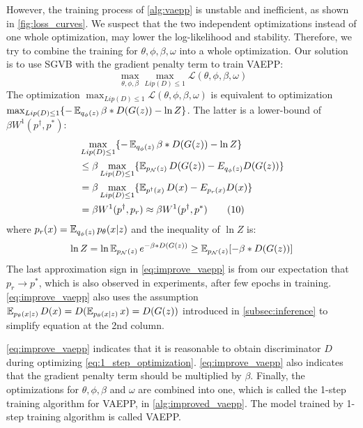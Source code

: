 However, the training process of \cref{alg:vaepp} is unstable and inefficient, as shown in \cref{fig:loss_curves}. 
We suspect that the two independent optimizations instead of one whole optimization, may lower the log-likelihood and stability. Therefore, we try to combine the training for $\theta, \phi, \beta, \omega$ into a whole optimization. 
Our solution is to use SGVB with the gradient penalty term to train VAEPP:
\begin{equation*}~\label{eq:1_step_optimization}
	\max_{\theta, \phi, \beta} \max_{Lip(D) \leq 1} \mathcal{L}(\theta, \phi, \beta, \omega) 
\end{equation*} 
The optimization $\max_{Lip(D) \leq 1} \mathcal{L}(\theta, \phi, \beta, \omega)$ is equivalent to optimization $\max_{Lip(D) \leq 1} \{ -\operatorname{\mathbb{E}}_{q_\phi(z)} \beta*D(G(z)) - \ln Z \}$. The latter is a lower-bound of $\beta W^1(p^\dag, p^*)$:
\begin{align*}\label{eq:improve_vaepp}
	&\max_{Lip(D) \leq 1} \{ -\operatorname{\mathbb{E}}_{q_\phi(z)} \beta*D(G(z)) - \ln Z \}\\ 
	&\leq \beta \max_{Lip(D) \leq 1} \{ \operatorname{\mathbb{E}}_{p_\mathcal{N}(z)} D(G(z)) - E_{q_\phi(z)} D(G(z)) \} \\
	&= \beta \max_{Lip(D) \leq 1} \{ \operatorname{\mathbb{E}}_{p^\dag(x)} D(x) - E_{p_r(x)} D(x) \} \\
	&= \beta W^1(p^\dag, p_r) \approx \beta W^1(p^\dag, p^*) \tag{10} 
\end{align*}
where $p_r(x) = \operatorname{\mathbb{E}}_{q_\phi(z)} p_\theta(x|z)$ and the inequality of $\ln Z$ is:
\begin{equation*}
	\ln Z = \ln \operatorname{\mathbb{E}}_{p_\mathcal{N}(z)} e^{- \beta * D(G(z))} \geq \operatorname{\mathbb{E}}_{p_\mathcal{N}(z)} [- \beta * D(G(z))]
\end{equation*}
The last approximation sign in \cref{eq:improve_vaepp} is from our expectation that $p_r \rightarrow p^*$, which is also observed in experiments, after few epochs in training. \cref{eq:improve_vaepp} also uses the assumption $\operatorname{\mathbb{E}}_{p_\theta(x|z)} D(x) = D(\operatorname{\mathbb{E}}_{p_\theta(x|z)} x) = D(G(z))$ introduced in \cref{subsec:inference} to simplify equation at the 2nd column. 

\cref{eq:improve_vaepp} indicates that it is reasonable to obtain  discriminator $D$ during optimizing \cref{eq:1_step_optimization}. \cref{eq:improve_vaepp} also indicates that the gradient penalty term should be multiplied by $\beta$. Finally, the optimizations for $\theta, \phi, \beta$ and $\omega$ are combined into one, which is called the 1-step training algorithm for VAEPP, in \cref{alg:improved_vaepp}. The model trained by 1-step training algorithm is called VAEPP. 

